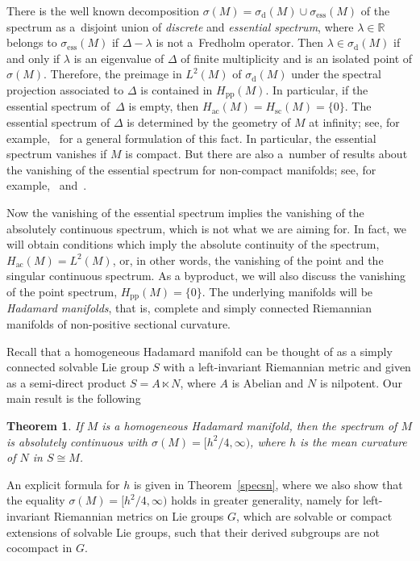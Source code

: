 \documentclass[pdftex]{sigma}
\numberwithin{equation}{section}
\newtheorem{Theorem}{Theorem}[section]
\DeclareMathOperator{\ess}{ess}
\def\p{\mathrm{pp}}
\def\d{\mathrm d}
\def\ac{\mathrm{ac}}
\def\sc{\mathrm{sc}}
\def\R{\mathbb R}
\begin{document}
There is the well known decomposition $\sigma(M)=\sigma_{\d}(M)\cup\sigma_{\ess}(M)$ of the spectrum
as a~disjoint union of \emph{discrete} and \emph{essential spectrum},
where $\lambda\in\R$ belongs to $\sigma_{\ess}(M)$ if $\Delta-\lambda$ is not a~Fredholm operator.
Then $\lambda\in\sigma_{\d}(M)$ if and only if $\lambda$ is an eigenvalue of $\Delta$
of finite multiplicity and is an isolated point of $\sigma(M)$.
Therefore, the preimage in $L^2(M)$ of $\sigma_{\d}(M)$ under the spectral projection associated to $\Delta$
is contained in $H_{\p}(M)$.
In particular, if the essential spectrum of~$\Delta$ is empty, then $H_{\ac}(M)=H_{\sc}(M)=\{0\}$.
The essential spectrum of $\Delta$ is determined by the geometry of $M$ at infinity;
see, for example,~\cite[Proposition 3.6]{BMM17} for a general formulation of this fact.
In particular, the essential spectrum vanishes if $M$ is compact.
But there are also a~number of results about the vanishing of the essential spectrum
for non-compact manifolds;
see, for example,~\cite[Theorems 1.1 and 1.2]{BLM10} and~\cite[Examples 3.7]{BMM17}.

Now the vanishing of the essential spectrum implies the vanishing of the absolutely continuous spectrum,
which is not what we are aiming for.
In fact, we will obtain conditions which imply the absolute continuity of the spectrum, $H_{\ac}(M)=L^2(M)$,
or, in other words, the vanishing of the point and the singular continuous spectrum.
As a byproduct, we will also discuss the vanishing of the point spectrum, $H_{\p}(M)=\{0\}$.
The underlying manifolds will be \emph{Hadamard manifolds}, that is,
complete and simply connected Riemannian manifolds of non-positive sectional curvature.

Recall that a homogeneous Hadamard manifold can be thought of as a simply connected solvable Lie group $S$
with a left-invariant Riemannian metric
and given as a semi-direct product $S=A\ltimes N$, where $A$ is Abelian and $N$ is nilpotent.
Our main result is the following

\begin{Theorem}\label{onlyach}
If $M$ is a homogeneous Hadamard manifold,
then the spectrum of $M$ is absolutely continuous with $\sigma(M)=\bigl[h^2/4,\infty\bigr)$,
where $h$ is the mean curvature of $N$ in $S\cong M$.
\end{Theorem}

An explicit formula for $h$ is given in Theorem~\ref{specsn},
where we also show that the equality $\sigma(M)=\bigl[h^2/4,\infty\bigr)$ holds in greater generality,
namely for left-invariant Riemannian metrics on Lie groups $G$,
which are solvable or compact extensions of solvable Lie groups,
such that their derived subgroups are not cocompact in $G$.
\end{document}
